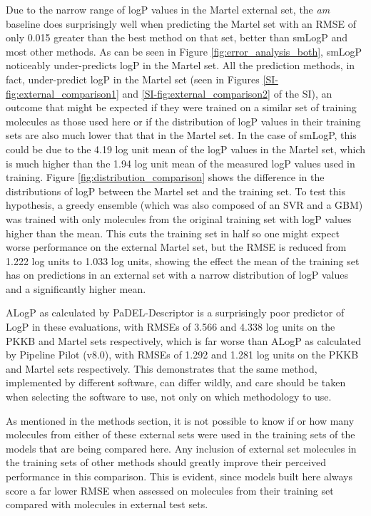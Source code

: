 \documentclass[10pt]{bmc_article}
\newenvironment{bmcformat}{\begin{raggedright}\baselineskip20pt\sloppy\setboolean{publ}{false}}{\end{raggedright}\baselineskip20pt\sloppy}
\begin{document}
\begin{bmcformat}
Due to the narrow range of logP values in the Martel external set, the \textit{am} baseline does surprisingly well when predicting the Martel set with an RMSE of only 0.015 greater than the best method on that set, better than smLogP and most other methods. As can be seen in Figure \ref{fig:error_analysis_both}, smLogP noticeably under-predicts logP in the Martel set. All the prediction methods, in fact, under-predict logP in the Martel set (seen in Figures \ref{SI-fig:external_comparison1} and \ref{SI-fig:external_comparison2} of the SI), an outcome that might be expected if they were trained on a similar set of training molecules as those used here or if the distribution of logP values in their training sets are also much lower that that in the Martel set. In the case of smLogP, this could be due to the 4.19 log unit mean of the logP values in the Martel set, which is much higher than the 1.94 log unit mean of the measured logP values used in training. Figure \ref{fig:distribution_comparison} shows the difference in the distributions of logP between the Martel set and the training set. To test this hypothesis, a greedy ensemble (which was also composed of an SVR and a GBM) was trained with only molecules from the original training set with logP values higher than the mean. This cuts the training set in half so one might expect worse performance on the external Martel set, but the RMSE is reduced from 1.222 log units to 1.033 log units, showing the effect the mean of the training set has on predictions in an external set with a narrow distribution of logP values and a significantly higher mean. 

ALogP as calculated by PaDEL-Descriptor is a surprisingly poor predictor of LogP in these evaluations, with RMSEs of 3.566 and 4.338 log units on the PKKB and Martel sets respectively, which is far worse than ALogP as calculated by Pipeline Pilot (v8.0), with RMSEs of 1.292 and 1.281 log units on the PKKB and Martel sets respectively. This demonstrates that the same method, implemented by different software, can differ wildly, and care should be taken when selecting the software to use, not only on which methodology to use.

As mentioned in the methods section, it is not possible to know if or how many molecules from either of these external sets were used in the training sets of the models that are being compared here. Any inclusion of external set molecules in the training sets of other methods should greatly improve their perceived performance in this comparison. This is evident, since models built here always score a far lower RMSE when assessed on molecules from their training set compared with molecules in external test sets.


\end{bmcformat}
\end{document}
